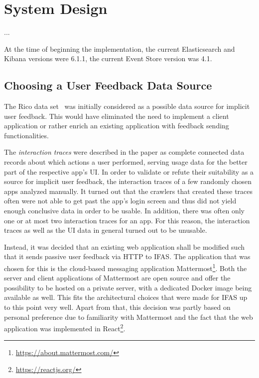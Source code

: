%
\chapter{System Design}
\label{ch:design}

...

At the time of beginning the implementation, the current Elasticsearch and Kibana versions were 6.1.1, the current Event Store version was 4.1.

\section{Choosing a User Feedback Data Source}
\label{sec:design:data-source}

The Rico data set~\cite{Deka:2017:Rico} was initially considered as a possible data source for implicit user feedback.
This would have eliminated the need to implement a client application or rather enrich an existing application with feedback sending functionalities.

The \emph{interaction traces} were described in the paper as complete connected data records about which actions a user performed, serving usage data for the better part of the respective app's \ac{UI}.
In order to validate or refute their suitability as a source for implicit user feedback, the interaction traces of a few randomly chosen apps analyzed manually.
It turned out that the crawlers that created these traces often were not able to get past the app's login screen and thus did not yield enough conclusive data in order to be usable.
In addition, there was often only one or at most two interaction traces for an app.
For this reason, the interaction traces as well as the \ac{UI} data in general turned out to be unusable.

Instead, it was decided that an existing web application shall be modified such that it sends passive user feedback via \ac{HTTP} to \ac{IFAS}.
The application that was chosen for this is the cloud-based messaging application Mattermost\footnote{\url{https://about.mattermost.com/}}.
Both the server and client applications of Mattermost are open source and offer the possibility to be hosted on a private server, with a dedicated Docker image being available as well.
This fits the architectural choices that were made for \ac{IFAS} up to this point very well.
Apart from that, this decision was partly based on personal preference due to familiarity with Mattermost and the fact that the web application was implemented in React\footnote{\url{https://reactjs.org/}}.

